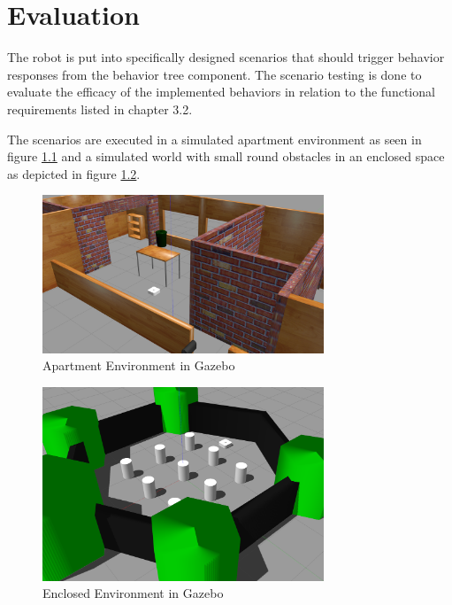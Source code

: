 \chapter{Evaluation}
\label{cha:ergebnisse}

The robot is put into specifically designed scenarios that should trigger behavior responses from the behavior tree component. The scenario testing is done to evaluate the efficacy of the implemented behaviors in relation to the functional requirements listed in chapter 3.2.

The scenarios are executed in a simulated apartment environment as seen in figure \ref{fig:house_gazebo} and a simulated world with small round obstacles in an enclosed space as depicted in figure \ref{fig:world_gazebo}. 
\begin{center}
\begin{figure}[ht]
	\includegraphics[width=0.75\textwidth]{images/house_env.png}
	\caption{Apartment Environment in Gazebo}
	\label{fig:house_gazebo}
\end{figure}
\end{center}

\begin{center}
\begin{figure}
	\includegraphics[width=0.75\textwidth]{images/world_env.png}
	\caption{Enclosed Environment in Gazebo}
	\label{fig:world_gazebo}
\end{figure}
\end{center}


